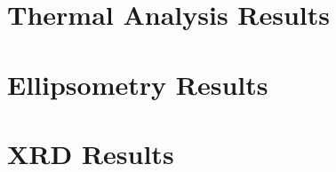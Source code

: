 \section{Thermal Analysis Results}
\label{sup:Thermal-Results}



\section{Ellipsometry Results}
\label{sup:Ellipsometry}



\section{XRD Results}

